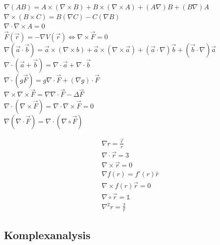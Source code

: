 \documentclass[12pt,a4paper, twoside]{article}
\newcommand{\grad}[1]{\nabla #1}
\renewcommand{\div}[1]{\nabla \cdot #1}
\newcommand{\rot}[1]{\nabla \times #1}
\renewcommand{\=}[1]{\stackrel{#1}{=}}
\newcommand{\ort}{\vec r}
\theoremstyle{definition}
\theoremstyle{remark}
\begin{document}
\begin{center}
\begin{minipage}[t]{.69\linewidth}
\vspace{0pt}

$\grad (AB) = A \times (\rot B) + B \times (\rot A) + (A\nabla)B + (B\nabla)A$\\
$\rot (B \times C) = B(\grad C) - C(\grad B)$\\
$\div \rot A = 0$\\
$\vec F (\vec r) = - \grad V(\vec r) \Leftrightarrow \nabla \times \vec{F} = 0$\\
$\grad (\vec a \cdot \vec b) = \vec a \times (\rot b) + \vec a \times (\rot \vec a) + (\vec a \cdot \grad) \vec b + (\vec b \cdot \grad) \vec a$\\
$\div (\vec a + \vec b) = \div \vec a + \div \vec b$\\
$\div (g\vec F) = g \div \vec F + (\grad g) \cdot \vec F$\\
$\rot \rot \vec{F} = \grad \div \vec{F} - \Delta \vec{F}$\\
$\div (\rot \vec{F}) = \div \rot \vec{F} = 0$\\
$\grad(\div \vec F) = \div (\grad \circ \vec F)$\\

\end{minipage}%
\begin{minipage}[t]{.29\linewidth}
\vspace{0pt}
\begin{framed}
\begin{align*}
&\grad r = \frac{\ort}{r}\\
&\div \ort = 3\\
&\rot \ort = 0\\
&\grad f(r) = f'(r) \hat r\\
&\rot f(r) \ort = 0\\
&\nabla \circ \ort = \mathbb{1}\\
&\nabla^2 r = \frac{2}{r}
\end{align*}
\end{framed}

\end{minipage}
\end{center}

\subsection{Komplexanalysis}
\end{document}
